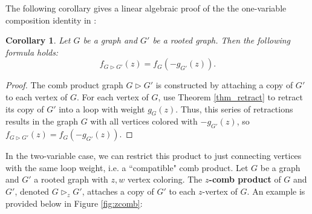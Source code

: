 \documentclass[12pt]{amsart}
\newtheorem{corollary}[theorem]{Corollary}
\theoremstyle{remark}
\numberwithin{equation}{section}
\newcommand{\dfn}[1]{{\bf #1}\index{#1}}
\newcommand{\comb}{\triangleright}
\begin{document}
The following corollary gives a linear algebraic proof of the the one-variable composition identity in \cite[Proposition~2.5]{ahl22}:

\begin{corollary}\label{staridentity}
    Let $G$ be a graph and $G'$ be a rooted graph. Then the following formula holds:
    \[
    f_{G \comb G'} (z) = f_G (- g_{G'} (z)).
    \]
\end{corollary}

\begin{proof}
    The comb product graph $G \comb G'$ is constructed by attaching a copy of $G'$ to each vertex of $G$. For each vertex of $G$, use Theorem \ref{thm_retract} to retract its copy of $G'$ into a loop with weight $g_{G} (z)$. Thus, this series of retractions results in the graph $G$ with all vertices colored with $-g_{G'} (z)$, so $f_{G \comb G'} (z) = f_G (- g_{G'} (z))$.
\end{proof}

In the two-variable case, we can restrict this product to just connecting vertices with the same loop weight, i.e. a ``compatible" comb product. Let $G$ be a graph and $G'$ a rooted graph with $z, w$ vertex coloring. The \dfn{$z$-comb product} of $G$ and $G'$, denoted $G \comb_z G'$, attaches a copy of $G'$ to each $z$-vertex of $G$. An example is provided below in Figure \ref{fig:zcomb}:
\end{document}
